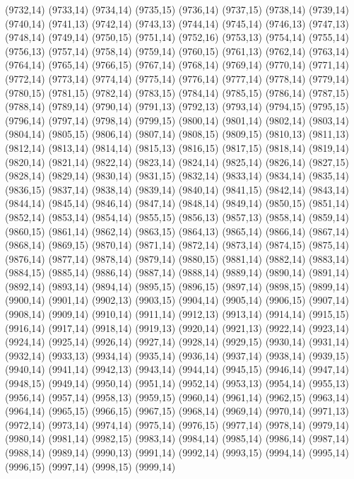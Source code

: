 (9732,14)
(9733,14)
(9734,14)
(9735,15)
(9736,14)
(9737,15)
(9738,14)
(9739,14)
(9740,14)
(9741,13)
(9742,14)
(9743,13)
(9744,14)
(9745,14)
(9746,13)
(9747,13)
(9748,14)
(9749,14)
(9750,15)
(9751,14)
(9752,16)
(9753,13)
(9754,14)
(9755,14)
(9756,13)
(9757,14)
(9758,14)
(9759,14)
(9760,15)
(9761,13)
(9762,14)
(9763,14)
(9764,14)
(9765,14)
(9766,15)
(9767,14)
(9768,14)
(9769,14)
(9770,14)
(9771,14)
(9772,14)
(9773,14)
(9774,14)
(9775,14)
(9776,14)
(9777,14)
(9778,14)
(9779,14)
(9780,15)
(9781,15)
(9782,14)
(9783,15)
(9784,14)
(9785,15)
(9786,14)
(9787,15)
(9788,14)
(9789,14)
(9790,14)
(9791,13)
(9792,13)
(9793,14)
(9794,15)
(9795,15)
(9796,14)
(9797,14)
(9798,14)
(9799,15)
(9800,14)
(9801,14)
(9802,14)
(9803,14)
(9804,14)
(9805,15)
(9806,14)
(9807,14)
(9808,15)
(9809,15)
(9810,13)
(9811,13)
(9812,14)
(9813,14)
(9814,14)
(9815,13)
(9816,15)
(9817,15)
(9818,14)
(9819,14)
(9820,14)
(9821,14)
(9822,14)
(9823,14)
(9824,14)
(9825,14)
(9826,14)
(9827,15)
(9828,14)
(9829,14)
(9830,14)
(9831,15)
(9832,14)
(9833,14)
(9834,14)
(9835,14)
(9836,15)
(9837,14)
(9838,14)
(9839,14)
(9840,14)
(9841,15)
(9842,14)
(9843,14)
(9844,14)
(9845,14)
(9846,14)
(9847,14)
(9848,14)
(9849,14)
(9850,15)
(9851,14)
(9852,14)
(9853,14)
(9854,14)
(9855,15)
(9856,13)
(9857,13)
(9858,14)
(9859,14)
(9860,15)
(9861,14)
(9862,14)
(9863,15)
(9864,13)
(9865,14)
(9866,14)
(9867,14)
(9868,14)
(9869,15)
(9870,14)
(9871,14)
(9872,14)
(9873,14)
(9874,15)
(9875,14)
(9876,14)
(9877,14)
(9878,14)
(9879,14)
(9880,15)
(9881,14)
(9882,14)
(9883,14)
(9884,15)
(9885,14)
(9886,14)
(9887,14)
(9888,14)
(9889,14)
(9890,14)
(9891,14)
(9892,14)
(9893,14)
(9894,14)
(9895,15)
(9896,15)
(9897,14)
(9898,15)
(9899,14)
(9900,14)
(9901,14)
(9902,13)
(9903,15)
(9904,14)
(9905,14)
(9906,15)
(9907,14)
(9908,14)
(9909,14)
(9910,14)
(9911,14)
(9912,13)
(9913,14)
(9914,14)
(9915,15)
(9916,14)
(9917,14)
(9918,14)
(9919,13)
(9920,14)
(9921,13)
(9922,14)
(9923,14)
(9924,14)
(9925,14)
(9926,14)
(9927,14)
(9928,14)
(9929,15)
(9930,14)
(9931,14)
(9932,14)
(9933,13)
(9934,14)
(9935,14)
(9936,14)
(9937,14)
(9938,14)
(9939,15)
(9940,14)
(9941,14)
(9942,13)
(9943,14)
(9944,14)
(9945,15)
(9946,14)
(9947,14)
(9948,15)
(9949,14)
(9950,14)
(9951,14)
(9952,14)
(9953,13)
(9954,14)
(9955,13)
(9956,14)
(9957,14)
(9958,13)
(9959,15)
(9960,14)
(9961,14)
(9962,15)
(9963,14)
(9964,14)
(9965,15)
(9966,15)
(9967,15)
(9968,14)
(9969,14)
(9970,14)
(9971,13)
(9972,14)
(9973,14)
(9974,14)
(9975,14)
(9976,15)
(9977,14)
(9978,14)
(9979,14)
(9980,14)
(9981,14)
(9982,15)
(9983,14)
(9984,14)
(9985,14)
(9986,14)
(9987,14)
(9988,14)
(9989,14)
(9990,13)
(9991,14)
(9992,14)
(9993,15)
(9994,14)
(9995,14)
(9996,15)
(9997,14)
(9998,15)
(9999,14)
